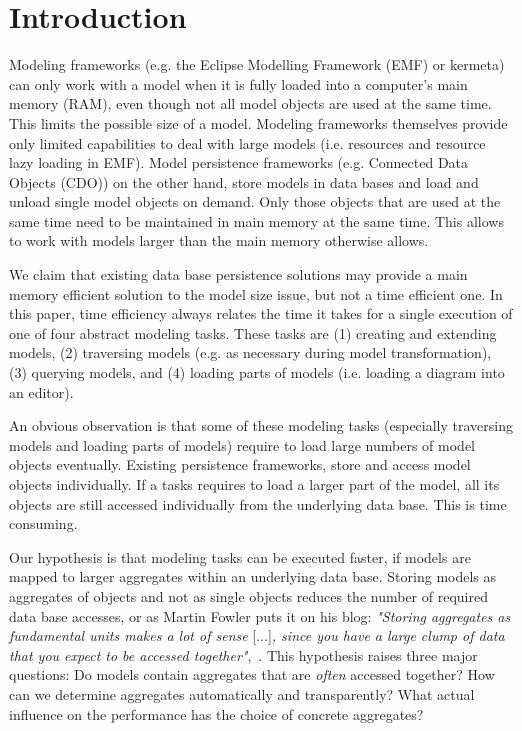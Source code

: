 \section{Introduction}

Modeling frameworks (e.g. the Eclipse Modelling Framework (EMF) or kermeta) can only work with a model when it is fully loaded into a computer's main memory (RAM), even though not all model objects are used at the same time.
This limits the possible size of a model. 
Modeling frameworks themselves provide only limited capabilities to deal with large models (i.e. resources and resource lazy loading in EMF). 
Model persistence frameworks (e.g. Connected Data Objects (CDO)) on the other hand, store models in data bases and load and unload single model objects on demand. 
Only those objects that are used at the same time need to be maintained in main memory at the same time. This allows to work with models larger than the main memory otherwise allows. 

We claim that existing data base persistence solutions may provide a main memory efficient solution to the model size issue, but not a time efficient one. In this paper, time efficiency always relates the time it takes for a single execution of one of four abstract modeling tasks. These tasks are (1) creating and extending models, (2) traversing models (e.g. as necessary during model transformation), (3) querying models, and (4) loading parts of models (i.e. loading a diagram into an editor).

An obvious observation is that some of these modeling tasks (especially traversing models and loading parts of models) require to load large numbers of model objects eventually. Existing persistence frameworks, store and access model objects individually. If a tasks requires to load a larger part of the model, all its objects are still accessed individually from the underlying data base. This is time consuming.

Our hypothesis is that modeling tasks can be executed faster, if models are mapped to larger aggregates within an underlying data base. Storing models as aggregates of objects and not as single objects reduces the number of required data base accesses, or as Martin Fowler puts it on his blog: \emph{"Storing aggregates as fundamental units makes a lot of sense} [...]\emph{, since you have a large clump of data that you expect to be accessed together"},~\cite{martinFowler}. This hypothesis raises three major questions: Do models contain aggregates that are \emph{often} accessed together? How can we determine aggregates automatically and transparently? What actual influence on the performance has the choice of concrete aggregates?

